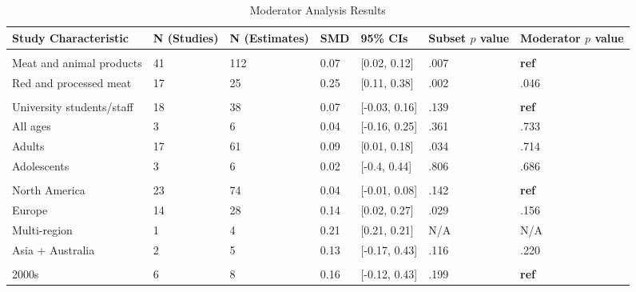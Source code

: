 \documentclass[preprint, 3p,
authoryear]{elsarticle} %
\begin{document}
\begin{table}[!h]

\caption{\label{tab:table_S1}Moderator Analysis Results}
\begin{tabular}[t]{lllll>{\raggedright\arraybackslash}p{2 cm}>{\raggedright\arraybackslash}p{2 cm}}
\toprule
Study Characteristic & N (Studies) & N (Estimates) & SMD & 95\% CIs & Subset $p$ value & Moderator $p$ value\\
\midrule
\addlinespace[0.3em]
\multicolumn{7}{l}{\textbf{Outcome}}\\
\hspace{1em}Meat and animal products & 41 & 112 & 0.07 & {}[0.02, 0.12] & .007 & \textbf{ref}\\
\hspace{1em}Red and processed meat & 17 & 25 & 0.25 & {}[0.11, 0.38] & .002 & .046\\
\addlinespace[0.3em]
\multicolumn{7}{l}{\textbf{Population}}\\
\hspace{1em}University students/staff & 18 & 38 & 0.07 & {}[-0.03, 0.16] & .139 & \textbf{ref}\\
\hspace{1em}All ages & 3 & 6 & 0.04 & {}[-0.16, 0.25] & .361 & .733\\
\hspace{1em}Adults & 17 & 61 & 0.09 & {}[0.01, 0.18] & .034 & .714\\
\hspace{1em}Adolescents & 3 & 6 & 0.02 & {}[-0.4, 0.44] & .806 & .686\\
\addlinespace[0.3em]
\multicolumn{7}{l}{\textbf{Region}}\\
\hspace{1em}North America & 23 & 74 & 0.04 & {}[-0.01, 0.08] & .142 & \textbf{ref}\\
\hspace{1em}Europe & 14 & 28 & 0.14 & {}[0.02, 0.27] & .029 & .156\\
\hspace{1em}Multi-region & 1 & 4 & 0.21 & {}[0.21, 0.21] & N/A & N/A\\
\hspace{1em}Asia + Australia & 2 & 5 & 0.13 & {}[-0.17, 0.43] & .116 & .220\\
\addlinespace[0.3em]
\multicolumn{7}{l}{\textbf{Publication Decade}}\\
\hspace{1em}2000s & 6 & 8 & 0.16 & {}[-0.12, 0.43] & .199 & \textbf{ref}\\

\end{tabular}
\end{table}
\end{document}

